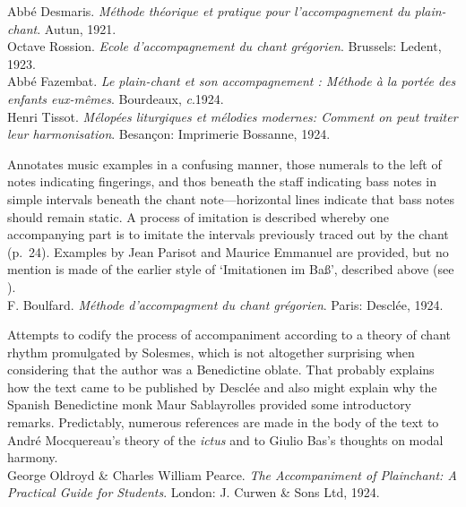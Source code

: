     \parindent=0pt
    \hangindent=0pt
  \covid{}Abbé Desmaris. \emph{Méthode théorique et pratique pour l'accompagnement du plain-chant}. Autun, 1921. \\

    \parindent=0pt
    \hangindent=0pt
  \covid{}Octave Rossion. \emph{Ecole d'accompagnement du chant grégorien}. Brussels:  Ledent, 1923. \\

    \parindent=0pt
    \hangindent=0pt
  \covid{}Abbé Fazembat. \emph{Le plain-chant et son accompagnement : Méthode à la portée des enfants eux-mêmes}. Bourdeaux, \emph{c}.1924. \\

    \parindent=0pt
    \hangindent=0pt
  Henri Tissot. \emph{Mélopées liturgiques et mélodies modernes: Comment on peut traiter leur harmonisation}. Besançon:  Imprimerie Bossanne, 1924.

     \parindent=20pt
     \hangindent=20pt
     Annotates music examples in a confusing manner, those numerals to the left of notes indicating fingerings, and thos beneath the staff indicating bass notes in simple intervals beneath the chant note---horizontal lines indicate that bass notes should remain static. A process of imitation is described whereby one accompanying part is to imitate the intervals previously traced out by the chant (p.~24). Examples by Jean Parisot and Maurice Emmanuel are provided, but no mention is made of the earlier style of `Imitationen im Baß', described above (see ).\\

    \parindent=0pt
    \hangindent=0pt
  F. Boulfard. \emph{Méthode d'accompagment du chant grégorien}. Paris:  Desclée, 1924.

     \parindent=20pt
     \hangindent=20pt
     Attempts to codify the process of accompaniment according to a theory of chant rhythm promulgated by Solesmes, which is not altogether surprising when considering that the author was a Benedictine oblate. That probably explains how the text came to be published by Desclée and also might explain why the Spanish Benedictine monk Maur Sablayrolles provided some introductory remarks. Predictably, numerous references are made in the body of the text to André Mocquereau's theory of the \emph{ictus} and to Giulio Bas's thoughts on modal harmony.\\

    \parindent=0pt
    \hangindent=0pt
  George Oldroyd \& Charles William Pearce. \emph{The Accompaniment of Plainchant: A Practical Guide for Students}. London:  J. Curwen \& Sons Ltd, 1924.

